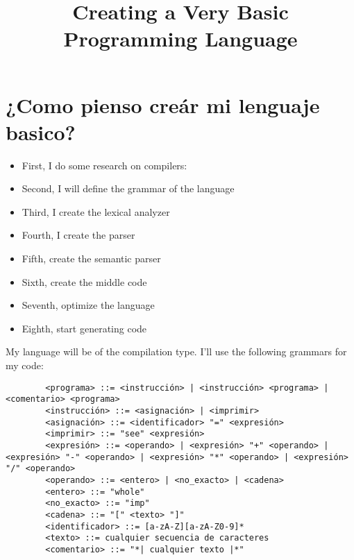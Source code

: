 \documentclass[a4,10pt]{article}
\title{Creating a Very Basic Programming Language}
\begin{document}
	
	\section{¿Como pienso creár mi lenguaje basico?}
	\begin{itemize}
		\item First, I do some research on compilers: 
		\item Second, I will define the grammar of the language
		\item Third, I create the lexical analyzer
		\item Fourth, I create the parser
		\item Fifth, create the semantic parser
		\item Sixth, create the middle code
		\item Seventh, optimize the language
		\item Eighth, start generating code
	\end{itemize}
	My language will be of the compilation type.
	I'll use the following grammars for my code:
	
	\begin{verbatim}
		<programa> ::= <instrucción> | <instrucción> <programa> | <comentario> <programa>
		<instrucción> ::= <asignación> | <imprimir>
		<asignación> ::= <identificador> "=" <expresión>
		<imprimir> ::= "see" <expresión>
		<expresión> ::= <operando> | <expresión> "+" <operando> | <expresión> "-" <operando> | <expresión> "*" <operando> | <expresión> "/" <operando>
		<operando> ::= <entero> | <no_exacto> | <cadena>
		<entero> ::= "whole"
		<no_exacto> ::= "imp"
		<cadena> ::= "[" <texto> "]"
		<identificador> ::= [a-zA-Z][a-zA-Z0-9]*
		<texto> ::= cualquier secuencia de caracteres
		<comentario> ::= "*| cualquier texto |*"
	\end{verbatim}
	
	\printbibliography
	
\end{document}
